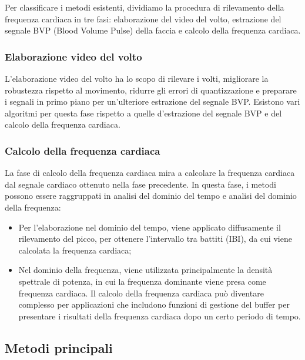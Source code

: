 \documentclass[journal,A4paper,compsoc,epsfig]{IEEEtran}
\begin{document}
      Per classificare i metodi esistenti, dividiamo la procedura di rilevamento della frequenza cardiaca in tre fasi: elaborazione del video del volto, estrazione del segnale BVP (Blood Volume Pulse) della faccia e calcolo della frequenza cardiaca.

      \subsubsection{Elaborazione video del volto}
        L'elaborazione video del volto ha lo scopo di rilevare i volti, migliorare la robustezza rispetto al movimento, ridurre gli errori di quantizzazione e preparare i segnali in primo piano per un'ulteriore estrazione del segnale BVP.
        Esistono vari algoritmi per questa fase rispetto a quelle d'estrazione del segnale BVP e del calcolo della frequenza cardiaca.    
        
      \subsubsection{Calcolo della frequenza cardiaca}
        La fase di calcolo della frequenza cardiaca mira a calcolare la frequenza cardiaca dal segnale cardiaco ottenuto nella fase precedente.
        In questa fase, i metodi possono essere raggruppati in analisi del dominio del tempo e analisi del dominio della frequenza:
        \begin{itemize}
          \item Per l'elaborazione nel dominio del tempo, viene applicato diffusamente il rilevamento del picco, per ottenere l'intervallo tra battiti (IBI), da cui viene calcolata la frequenza cardiaca;
          \item Nel dominio della frequenza, viene utilizzata principalmente la densità spettrale di potenza, in cui la frequenza dominante viene presa come frequenza cardiaca. Il calcolo della frequenza cardiaca può diventare complesso per applicazioni che includono funzioni di gestione del buffer per presentare i risultati della frequenza cardiaca dopo un certo periodo di tempo.
        \end{itemize}

    \subsection{Metodi principali}
\end{document}
